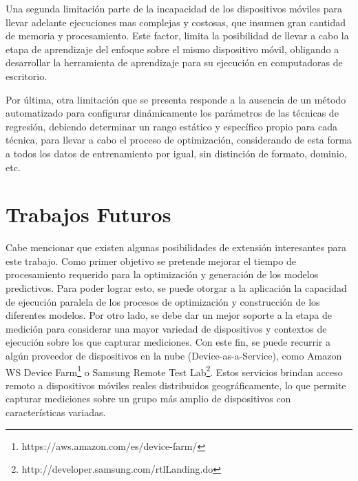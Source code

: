 Una segunda limitación parte de la incapacidad de los dispositivos
móviles para llevar adelante ejecuciones mas complejas y costosas,
que insumen gran cantidad de memoria y procesamiento. Este factor,
limita la posibilidad de llevar a cabo la etapa de aprendizaje del
enfoque sobre el mismo dispositivo móvil, obligando a desarrollar
la herramienta de aprendizaje para su ejecución en computadoras de
escritorio. 

Por última, otra limitación que se presenta responde a la ausencia
de un método automatizado para configurar dinámicamente los parámetros
de las técnicas de regresión, debiendo determinar un rango estático
y específico propio para cada técnica, para llevar a cabo el proceso
de optimización, considerando de esta forma a todos los datos de entrenamiento
por igual, sin distinción de formato, dominio, etc.




\section{Trabajos Futuros}

Cabe mencionar que existen algunas posibilidades de extensión interesantes
para este trabajo. Como primer objetivo se pretende mejorar el tiempo
de procesamiento requerido para la optimización y generación de los
modelos predictivos. Para poder lograr esto, se puede otorgar a la
aplicación la capacidad de ejecución paralela de los procesos de optimización
y construcción de los diferentes modelos. Por otro lado, se debe dar
un mejor soporte a la etapa de medición para considerar una mayor
variedad de dispositivos y contextos de ejecución sobre los que capturar
mediciones. Con este fin, se puede recurrir a algún proveedor de dispositivos
en la nube (Device-as-a-Service), como Amazon WS Device Farm\footnote{https://aws.amazon.com/es/device-farm/}
o Samsung Remote Test Lab\footnote{http://developer.samsung.com/rtlLanding.do}.
Estos servicios brindan acceso remoto a dispositivos móviles reales
distribuidos geográficamente, lo que permite capturar mediciones sobre
un grupo más amplio de dispositivos con características variadas.

